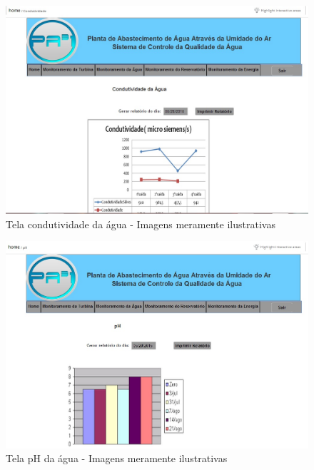 \begin{center}
\begin{figure}[!ht]
\centering
\includegraphics[scale=0.5]{figuras/8}
\caption[Tela condutividade da água]{Tela condutividade da água - Imagens meramente ilustrativas}
\label{tela_condutividade_da_agua}
\end{figure}
\clearpage

\begin{figure}[!ht]
\centering
\includegraphics[scale=0.5]{figuras/9}
\caption[Tela pH da água]{Tela pH da água - Imagens meramente ilustrativas}
\label{tela_pH_da_agua}
\end{figure}
\clearpage


\end{center}
